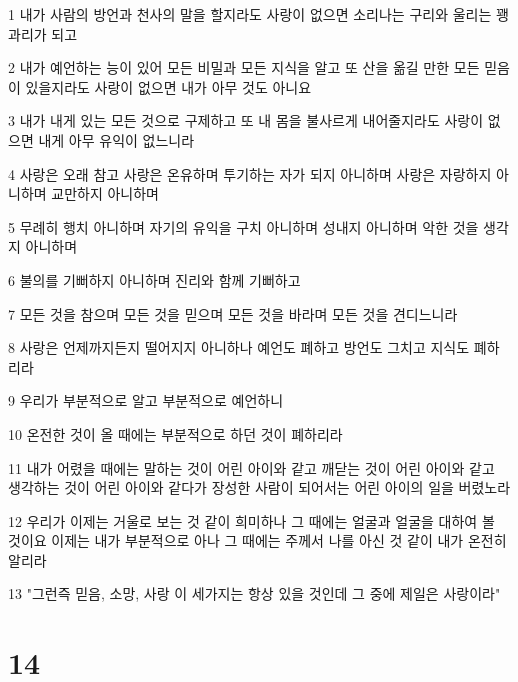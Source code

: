 \par 1 내가 사람의 방언과 천사의 말을 할지라도 사랑이 없으면 소리나는 구리와 울리는 꽹과리가 되고
\par 2 내가 예언하는 능이 있어 모든 비밀과 모든 지식을 알고 또 산을 옮길 만한 모든 믿음이 있을지라도 사랑이 없으면 내가 아무 것도 아니요
\par 3 내가 내게 있는 모든 것으로 구제하고 또 내 몸을 불사르게 내어줄지라도 사랑이 없으면 내게 아무 유익이 없느니라
\par 4 사랑은 오래 참고 사랑은 온유하며 투기하는 자가 되지 아니하며 사랑은 자랑하지 아니하며 교만하지 아니하며
\par 5 무례히 행치 아니하며 자기의 유익을 구치 아니하며 성내지 아니하며 악한 것을 생각지 아니하며
\par 6 불의를 기뻐하지 아니하며 진리와 함께 기뻐하고
\par 7 모든 것을 참으며 모든 것을 믿으며 모든 것을 바라며 모든 것을 견디느니라
\par 8 사랑은 언제까지든지 떨어지지 아니하나 예언도 폐하고 방언도 그치고 지식도 폐하리라
\par 9 우리가 부분적으로 알고 부분적으로 예언하니
\par 10 온전한 것이 올 때에는 부분적으로 하던 것이 폐하리라
\par 11 내가 어렸을 때에는 말하는 것이 어린 아이와 같고 깨닫는 것이 어린 아이와 같고 생각하는 것이 어린 아이와 같다가 장성한 사람이 되어서는 어린 아이의 일을 버렸노라
\par 12 우리가 이제는 거울로 보는 것 같이 희미하나 그 때에는 얼굴과 얼굴을 대하여 볼 것이요 이제는 내가 부분적으로 아나 그 때에는 주께서 나를 아신 것 같이 내가 온전히 알리라
\par 13 "그런즉 믿음, 소망, 사랑 이 세가지는 항상 있을 것인데 그 중에 제일은 사랑이라"

\chapter{14}


